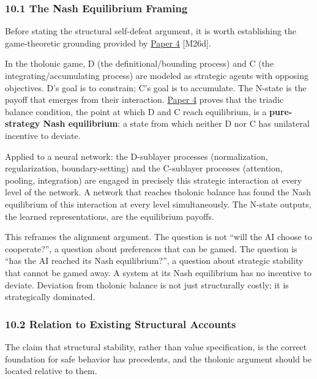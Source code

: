 \documentclass[
  11pt,
  letterpaper,
]{article}
\begin{document}
\subsubsection{10.1 The Nash Equilibrium
Framing}\label{the-nash-equilibrium-framing}

Before stating the structural self-defeat argument, it is worth
establishing the game-theoretic grounding provided by
\href{https://github.com/baardev/truevalue/blob/main/docnav/Research/papers/4_game-theoretic-triadic-balance/4_game-theoretic-triadic-balance.pdf}{Paper
4} {[}M26d{]}.

In the tholonic game, D (the definitional/bounding process) and C (the
integrating/accumulating process) are modeled as strategic agents with
opposing objectives. D's goal is to constrain; C's goal is to
accumulate. The N-state is the payoff that emerges from their
interaction.
\href{https://github.com/baardev/truevalue/blob/main/docnav/Research/papers/4_game-theoretic-triadic-balance/4_game-theoretic-triadic-balance.pdf}{Paper
4} proves that the triadic balance condition, the point at which D and C
reach equilibrium, is a \textbf{pure-strategy Nash equilibrium}: a state
from which neither D nor C has unilateral incentive to deviate.

Applied to a neural network: the D-sublayer processes (normalization,
regularization, boundary-setting) and the C-sublayer processes
(attention, pooling, integration) are engaged in precisely this
strategic interaction at every level of the network. A network that
reaches tholonic balance has found the Nash equilibrium of this
interaction at every level simultaneously. The N-state outputs, the
learned representations, are the equilibrium payoffs.

This reframes the alignment argument. The question is not ``will the AI
choose to cooperate?'', a question about preferences that can be gamed.
The question is ``has the AI reached its Nash equilibrium?'', a question
about strategic stability that cannot be gamed away. A system at its
Nash equilibrium has no incentive to deviate. Deviation from tholonic
balance is not just structurally costly; it is strategically dominated.

\subsubsection{10.2 Relation to Existing Structural
Accounts}\label{relation-to-existing-structural-accounts}

The claim that structural stability, rather than value specification, is
the correct foundation for safe behavior has precedents, and the
tholonic argument should be located relative to them.
\end{document}
